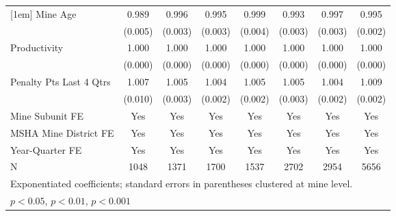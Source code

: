 {\begin{tabular}{l*{7}{c}}
[1em]
Mine Age                 &       0.989\sym{*}  &       0.996         &       0.995         &       0.999         &       0.993\sym{*}  &       0.997         &       0.995\sym{*}  \\
                         &     (0.005)         &     (0.003)         &     (0.003)         &     (0.004)         &     (0.003)         &     (0.003)         &     (0.002)         \\
[1em]
Productivity             &       1.000\sym{*}  &       1.000         &       1.000         &       1.000         &       1.000\sym{*}  &       1.000\sym{*}  &       1.000         \\
                         &     (0.000)         &     (0.000)         &     (0.000)         &     (0.000)         &     (0.000)         &     (0.000)         &     (0.000)         \\
[1em]
Penalty Pts Last 4 Qtrs  &       1.007         &       1.005         &       1.004         &       1.005         &       1.005         &       1.004\sym{*}  &       1.009\sym{***}\\
                         &     (0.010)         &     (0.003)         &     (0.002)         &     (0.002)         &     (0.003)         &     (0.002)         &     (0.002)         \\
[1em]
Mine Subunit FE          &         Yes         &         Yes         &         Yes         &         Yes         &         Yes         &         Yes         &         Yes         \\
[1em]
MSHA Mine District FE    &         Yes         &         Yes         &         Yes         &         Yes         &         Yes         &         Yes         &         Yes         \\
[1em]
Year-Quarter FE          &         Yes         &         Yes         &         Yes         &         Yes         &         Yes         &         Yes         &         Yes         \\
\hline
N                        &        1048         &        1371         &        1700         &        1537         &        2702         &        2954         &        5656         \\
\hline\hline
\multicolumn{8}{l}{\footnotesize Exponentiated coefficients; standard errors in parentheses clustered at mine level.}\\
\multicolumn{8}{l}{\footnotesize \sym{*} \(p<0.05\), \sym{**} \(p<0.01\), \sym{***} \(p<0.001\)}\\
\end{tabular}
}
